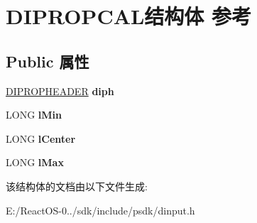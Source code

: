 \hypertarget{struct_d_i_p_r_o_p_c_a_l}{}\section{D\+I\+P\+R\+O\+P\+C\+A\+L结构体 参考}
\label{struct_d_i_p_r_o_p_c_a_l}
\subsection*{Public 属性}
\begin{DoxyCompactItemize}
\item 
\mbox{\label{struct_d_i_p_r_o_p_c_a_l_a6e042f3c72c54370265076c31e6ba05d}} 
\hyperlink{struct_d_i_p_r_o_p_h_e_a_d_e_r}{D\+I\+P\+R\+O\+P\+H\+E\+A\+D\+ER} {\bfseries diph}
\item 
\mbox{\label{struct_d_i_p_r_o_p_c_a_l_a3fbe0e69961bdb6b14079d0743d70316}} 
L\+O\+NG {\bfseries l\+Min}
\item 
\mbox{\label{struct_d_i_p_r_o_p_c_a_l_a4f4a53d45f0835f0cd70f7942c6e1ee2}} 
L\+O\+NG {\bfseries l\+Center}
\item 
\mbox{\label{struct_d_i_p_r_o_p_c_a_l_aa6153838f6649d8d04dec8988c5e30fc}} 
L\+O\+NG {\bfseries l\+Max}
\end{DoxyCompactItemize}


该结构体的文档由以下文件生成\+:\begin{DoxyCompactItemize}
\item 
E\+:/\+React\+O\+S-\/0../sdk/include/psdk/dinput.\+h\end{DoxyCompactItemize}
